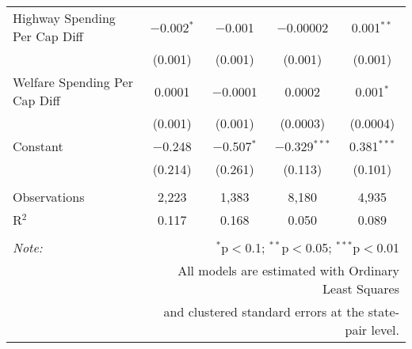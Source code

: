 \begin{table}[!htbp]
\begin{tabular}{@{\extracolsep{5pt}}lcccc}
  Highway Spending Per Cap Diff & $-$0.002$^{*}$ & $-$0.001 & $-$0.00002 & 0.001$^{**}$ \\ 
  & (0.001) & (0.001) & (0.001) & (0.001) \\ 
  Welfare Spending Per Cap Diff & 0.0001 & $-$0.0001 & 0.0002 & 0.001$^{*}$ \\ 
  & (0.001) & (0.001) & (0.0003) & (0.0004) \\ 
  Constant & $-$0.248 & $-$0.507$^{*}$ & $-$0.329$^{***}$ & 0.381$^{***}$ \\ 
  & (0.214) & (0.261) & (0.113) & (0.101) \\ 
 \hline \\[-1.8ex] 
Observations & 2,223 & 1,383 & 8,180 & 4,935 \\ 
R$^{2}$ & 0.117 & 0.168 & 0.050 & 0.089 \\ 
\hline 
\hline \\[-1.8ex] 
\textit{Note:}  & \multicolumn{4}{r}{$^{*}$p$<$0.1; $^{**}$p$<$0.05; $^{***}$p$<$0.01} \\ 
 & \multicolumn{4}{r}{All models are estimated with Ordinary Least Squares} \\ 
 & \multicolumn{4}{r}{and clustered standard errors at the state-pair level.} \\ 
\end{tabular} 
\end{table} 
